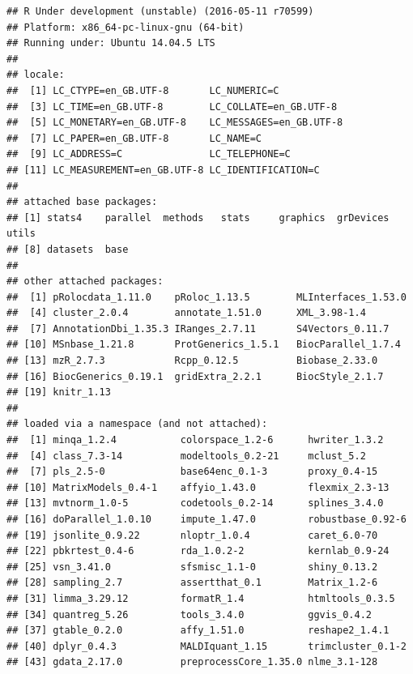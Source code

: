 \begin{knitrout}
\color{fgcolor}\begin{kframe}
\begin{alltt}
\hlstd{()}
\end{alltt}
\begin{verbatim}
## R Under development (unstable) (2016-05-11 r70599)
## Platform: x86_64-pc-linux-gnu (64-bit)
## Running under: Ubuntu 14.04.5 LTS
## 
## locale:
##  [1] LC_CTYPE=en_GB.UTF-8       LC_NUMERIC=C              
##  [3] LC_TIME=en_GB.UTF-8        LC_COLLATE=en_GB.UTF-8    
##  [5] LC_MONETARY=en_GB.UTF-8    LC_MESSAGES=en_GB.UTF-8   
##  [7] LC_PAPER=en_GB.UTF-8       LC_NAME=C                 
##  [9] LC_ADDRESS=C               LC_TELEPHONE=C            
## [11] LC_MEASUREMENT=en_GB.UTF-8 LC_IDENTIFICATION=C       
## 
## attached base packages:
## [1] stats4    parallel  methods   stats     graphics  grDevices utils    
## [8] datasets  base     
## 
## other attached packages:
##  [1] pRolocdata_1.11.0    pRoloc_1.13.5        MLInterfaces_1.53.0 
##  [4] cluster_2.0.4        annotate_1.51.0      XML_3.98-1.4        
##  [7] AnnotationDbi_1.35.3 IRanges_2.7.11       S4Vectors_0.11.7    
## [10] MSnbase_1.21.8       ProtGenerics_1.5.1   BiocParallel_1.7.4  
## [13] mzR_2.7.3            Rcpp_0.12.5          Biobase_2.33.0      
## [16] BiocGenerics_0.19.1  gridExtra_2.2.1      BiocStyle_2.1.7     
## [19] knitr_1.13          
## 
## loaded via a namespace (and not attached):
##  [1] minqa_1.2.4           colorspace_1.2-6      hwriter_1.3.2        
##  [4] class_7.3-14          modeltools_0.2-21     mclust_5.2           
##  [7] pls_2.5-0             base64enc_0.1-3       proxy_0.4-15         
## [10] MatrixModels_0.4-1    affyio_1.43.0         flexmix_2.3-13       
## [13] mvtnorm_1.0-5         codetools_0.2-14      splines_3.4.0        
## [16] doParallel_1.0.10     impute_1.47.0         robustbase_0.92-6    
## [19] jsonlite_0.9.22       nloptr_1.0.4          caret_6.0-70         
## [22] pbkrtest_0.4-6        rda_1.0.2-2           kernlab_0.9-24       
## [25] vsn_3.41.0            sfsmisc_1.1-0         shiny_0.13.2         
## [28] sampling_2.7          assertthat_0.1        Matrix_1.2-6         
## [31] limma_3.29.12         formatR_1.4           htmltools_0.3.5      
## [34] quantreg_5.26         tools_3.4.0           ggvis_0.4.2          
## [37] gtable_0.2.0          affy_1.51.0           reshape2_1.4.1       
## [40] dplyr_0.4.3           MALDIquant_1.15       trimcluster_0.1-2    
## [43] gdata_2.17.0          preprocessCore_1.35.0 nlme_3.1-128         

\end{verbatim}
\end{kframe}
\end{knitrout}
